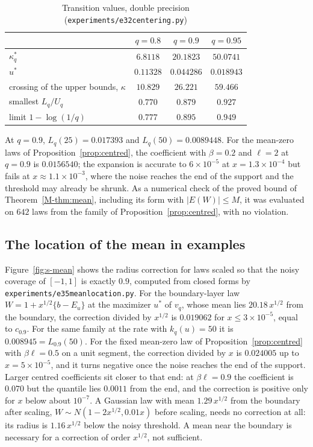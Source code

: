 \documentclass[11pt]{article}
\renewcommand{\_}{\usc\allowbreak}
\begin{document}
\begin{table}[h]
\centering
\caption{Transition values, double precision (\texttt{experiments/e32\_centering.py})}
\label{tab:s-transition}
\begin{tabular}{lccc}
\toprule
 & $q = 0.8$ & $q = 0.9$ & $q = 0.95$ \\
\midrule
$\kappa^*_q$ & $6.8118$ & $20.1823$ & $50.0741$ \\
$u^*$ & $0.11328$ & $0.044286$ & $0.018943$ \\
crossing of the upper bounds, $\kappa$ & $10.829$ & $26.221$ & $59.466$ \\
smallest $L_q/U_q$ & $0.770$ & $0.879$ & $0.927$ \\
limit $1 - \log(1/q)$ & $0.777$ & $0.895$ & $0.949$ \\
\bottomrule
\end{tabular}
\end{table}

At $q = 0.9$, $L_q(25) = 0.017393$ and $L_q(50) = 0.0089448$. For the mean-zero laws of Proposition~\ref{prop:centred}, the coefficient with $\beta = 0.2$ and $\ell = 2$ at $q = 0.9$ is $0.0156540$; the expansion is accurate to $6\times10^{-5}$ at $x = 1.3\times10^{-4}$ but fails at $x \approx 1.1\times10^{-3}$, where the noise reaches the end of the support and the threshold may already be shrunk. As a numerical check of the proved bound of Theorem~\ref{M-thm:mean}, including its form with $|E(W)| \le M$, it was evaluated on $642$ laws from the family of Proposition~\ref{prop:centred}, with no violation.

\subsection*{The location of the mean in examples}

Figure~\ref{fig:s-mean} shows the radius correction for laws scaled so that the noisy coverage of $[-1, 1]$ is exactly $0.9$, computed from closed forms by \texttt{experiments/e35\_mean\_location.py}. For the boundary-layer law $W = 1 + x^{1/2}\{b - E_u\}$ at the maximizer $u^*$ of $v_q$, whose mean lies $20.18\,x^{1/2}$ from the boundary, the correction divided by $x^{1/2}$ is $0.019062$ for $x \le 3\times10^{-5}$, equal to $c_{0.9}$. For the same family at the rate with $k_q(u) = 50$ it is $0.008945 = L_{0.9}(50)$. For the fixed mean-zero law of Proposition~\ref{prop:centred} with $\beta\ell = 0.5$ on a unit segment, the correction divided by $x$ is $0.024005$ up to $x = 5\times10^{-5}$, and it turns negative once the noise reaches the end of the support. Larger centred coefficients sit closer to that end: at $\beta\ell = 0.9$ the coefficient is $0.070$ but the quantile lies $0.0011$ from the end, and the correction is positive only for $x$ below about $10^{-7}$. A Gaussian law with mean $1.29\,x^{1/2}$ from the boundary after scaling, $W \sim N(1 - 2x^{1/2}, 0.01x)$ before scaling, needs no correction at all: its radius is $1.16\,x^{1/2}$ below the noisy threshold. A mean near the boundary is necessary for a correction of order $x^{1/2}$, not sufficient.
\end{document}
